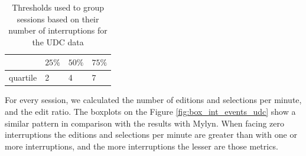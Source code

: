 \documentclass[times]{smrauth}
\begin{document}
\begin{table}[ht!]
\tiny
\renewcommand{\arraystretch}{1.3}
\caption{Thresholds used to group sessions based on their number of interruptions for the UDC data} %
\label{tbl:quartil_int_udc}
\centering
\begin{tabular}{l | p{0.6cm} | p{0.6cm} | p{0.6cm}} 
     & $25\%$ & $50\%$ & $75\%$ \\  
  \hline 
  quartile &  2 & 4 & 7  \\   
\end{tabular}
\end{table}

For every session, we calculated the number of editions and selections per minute, and the edit ratio. The boxplots on the Figure \ref{fig:box_int_events_udc} show a similar pattern in comparison with the results with Mylyn. When facing zero interruptions the editions and selections per minute are greater than with one or more interruptions, and the more interruptions the lesser are those metrics.
\end{document}
